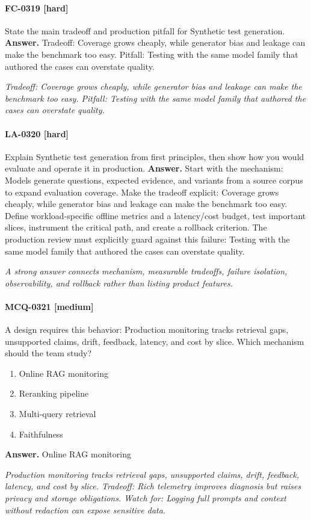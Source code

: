 \paragraph{FC-0319 [hard]} State the main tradeoff and production pitfall for Synthetic test generation.
\noindent\textbf{Answer.} Tradeoff: Coverage grows cheaply, while generator bias and leakage can make the benchmark too easy. Pitfall: Testing with the same model family that authored the cases can overstate quality.
\par\textit{Tradeoff: Coverage grows cheaply, while generator bias and leakage can make the benchmark too easy. Pitfall: Testing with the same model family that authored the cases can overstate quality.}
\paragraph{LA-0320 [hard]} Explain Synthetic test generation from first principles, then show how you would evaluate and operate it in production.
\noindent\textbf{Answer.} Start with the mechanism: Models generate questions, expected evidence, and variants from a source corpus to expand evaluation coverage. Make the tradeoff explicit: Coverage grows cheaply, while generator bias and leakage can make the benchmark too easy. Define workload-specific offline metrics and a latency/cost budget, test important slices, instrument the critical path, and create a rollback criterion. The production review must explicitly guard against this failure: Testing with the same model family that authored the cases can overstate quality.
\par\textit{A strong answer connects mechanism, measurable tradeoffs, failure isolation, observability, and rollback rather than listing product features.}
\paragraph{MCQ-0321 [medium]} A design requires this behavior: Production monitoring tracks retrieval gaps, unsupported claims, drift, feedback, latency, and cost by slice. Which mechanism should the team study?
\begin{enumerate}[label=\Alph*.]
\item Online RAG monitoring
\item Reranking pipeline
\item Multi-query retrieval
\item Faithfulness
\end{enumerate}
\noindent\textbf{Answer.} Online RAG monitoring
\par\textit{Production monitoring tracks retrieval gaps, unsupported claims, drift, feedback, latency, and cost by slice. Tradeoff: Rich telemetry improves diagnosis but raises privacy and storage obligations. Watch for: Logging full prompts and context without redaction can expose sensitive data.}
